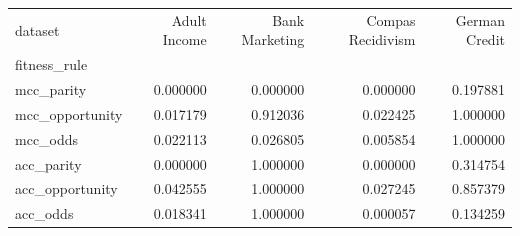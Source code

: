 \begin{tabular}{lrrrr}
\toprule
dataset & Adult Income & Bank Marketing & Compas Recidivism & German Credit \\
fitness_rule &  &  &  &  \\
\midrule
mcc_parity & 0.000000 & 0.000000 & 0.000000 & 0.197881 \\
mcc_opportunity & 0.017179 & 0.912036 & 0.022425 & 1.000000 \\
mcc_odds & 0.022113 & 0.026805 & 0.005854 & 1.000000 \\
acc_parity & 0.000000 & 1.000000 & 0.000000 & 0.314754 \\
acc_opportunity & 0.042555 & 1.000000 & 0.027245 & 0.857379 \\
acc_odds & 0.018341 & 1.000000 & 0.000057 & 0.134259 \\
\bottomrule
\end{tabular}
